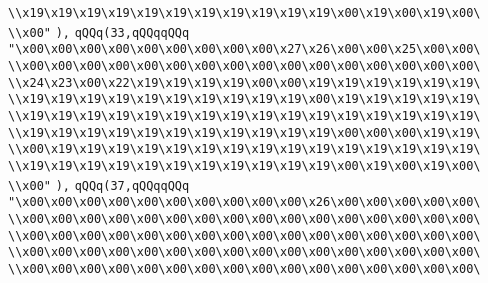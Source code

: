 \verb|\\x19\x19\x19\x19\x19\x19\x19\x19\x19\x19\x19\x00\x19\x00\x19\x00\|\newline
\verb|\\x00"|\newline
\verb|),|\newline
\verb|qQQq(33,qQQqqQQq|\newline
\verb|"\x00\x00\x00\x00\x00\x00\x00\x00\x00\x27\x26\x00\x00\x25\x00\x00\|\newline
\verb|\\x00\x00\x00\x00\x00\x00\x00\x00\x00\x00\x00\x00\x00\x00\x00\x00\|\newline
\verb|\\x24\x23\x00\x22\x19\x19\x19\x19\x00\x00\x19\x19\x19\x19\x19\x19\|\newline
\verb|\\x19\x19\x19\x19\x19\x19\x19\x19\x19\x19\x00\x19\x19\x19\x19\x19\|\newline
\verb|\\x19\x19\x19\x19\x19\x19\x19\x19\x19\x19\x19\x19\x19\x19\x19\x19\|\newline
\verb|\\x19\x19\x19\x19\x19\x19\x19\x19\x19\x19\x19\x00\x00\x00\x19\x19\|\newline
\verb|\\x00\x19\x19\x19\x19\x19\x19\x19\x19\x19\x19\x19\x19\x19\x19\x19\|\newline
\verb|\\x19\x19\x19\x19\x19\x19\x19\x19\x19\x19\x19\x00\x19\x00\x19\x00\|\newline
\verb|\\x00"|\newline
\verb|),|\newline
\verb|qQQq(37,qQQqqQQq|\newline
\verb|"\x00\x00\x00\x00\x00\x00\x00\x00\x00\x00\x26\x00\x00\x00\x00\x00\|\newline
\verb|\\x00\x00\x00\x00\x00\x00\x00\x00\x00\x00\x00\x00\x00\x00\x00\x00\|\newline
\verb|\\x00\x00\x00\x00\x00\x00\x00\x00\x00\x00\x00\x00\x00\x00\x00\x00\|\newline
\verb|\\x00\x00\x00\x00\x00\x00\x00\x00\x00\x00\x00\x00\x00\x00\x00\x00\|\newline
\verb|\\x00\x00\x00\x00\x00\x00\x00\x00\x00\x00\x00\x00\x00\x00\x00\x00\|\newline
